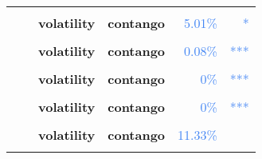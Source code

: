 \documentclass[
  authoryear,
  preprint,
  3p]{elsarticle}
\begin{document}
\begin{longtable}[t]{>{}l>{}l>{}l>{}l>{}r>{}r}
\textbf{\cellcolor{gray!10}{}} & \textbf{\cellcolor{gray!10}{financialisation}} & \textbf{\cellcolor{gray!10}{mean}} & \textbf{\cellcolor{gray!10}{contango}} & \textcolor[HTML]{4285f4}{\cellcolor{gray!10}{88.44\%}} & \textcolor[HTML]{4285f4}{\cellcolor{gray!10}{}}\\
\textbf{} & \textbf{} & \textbf{volatility} & \textbf{contango} & \textcolor[HTML]{4285f4}{5.01\%} & \textcolor[HTML]{4285f4}{*}\\
\textbf{\cellcolor{gray!10}{}} & \textbf{\cellcolor{gray!10}{crisis}} & \textbf{\cellcolor{gray!10}{mean}} & \textbf{\cellcolor{gray!10}{contango}} & \textcolor[HTML]{4285f4}{\cellcolor{gray!10}{87.12\%}} & \textcolor[HTML]{4285f4}{\cellcolor{gray!10}{}}\\
\textbf{} & \textbf{} & \textbf{volatility} & \textbf{contango} & \textcolor[HTML]{4285f4}{0.08\%} & \textcolor[HTML]{4285f4}{***}\\
\addlinespace
\textbf{\cellcolor{gray!10}{}} & \textbf{\cellcolor{gray!10}{post-crisis}} & \textbf{\cellcolor{gray!10}{mean}} & \textbf{\cellcolor{gray!10}{backwardation}} & \textcolor[HTML]{4285f4}{\cellcolor{gray!10}{61.83\%}} & \textcolor[HTML]{4285f4}{\cellcolor{gray!10}{}}\\
\textbf{} & \textbf{} & \textbf{volatility} & \textbf{contango} & \textcolor[HTML]{4285f4}{0\%} & \textcolor[HTML]{4285f4}{\vphantom{10} ***}\\
\textbf{\cellcolor{gray!10}{Aluminium-primary (XLME)}} & \textbf{\cellcolor{gray!10}{past}} & \textbf{\cellcolor{gray!10}{mean}} & \textbf{\cellcolor{gray!10}{backwardation}} & \textcolor[HTML]{4285f4}{\cellcolor{gray!10}{86.1\%}} & \textcolor[HTML]{4285f4}{\cellcolor{gray!10}{}}\\
\textbf{} & \textbf{} & \textbf{volatility} & \textbf{contango} & \textcolor[HTML]{4285f4}{0\%} & \textcolor[HTML]{4285f4}{\vphantom{9} ***}\\
\textbf{\cellcolor{gray!10}{}} & \textbf{\cellcolor{gray!10}{financialisation}} & \textbf{\cellcolor{gray!10}{mean}} & \textbf{\cellcolor{gray!10}{backwardation}} & \textcolor[HTML]{4285f4}{\cellcolor{gray!10}{91.59\%}} & \textcolor[HTML]{4285f4}{\cellcolor{gray!10}{}}\\
\addlinespace
\textbf{} & \textbf{} & \textbf{volatility} & \textbf{contango} & \textcolor[HTML]{4285f4}{11.33\%} & \textcolor[HTML]{4285f4}{}\\
\textbf{\cellcolor{gray!10}{}} & \textbf{\cellcolor{gray!10}{crisis}} & \textbf{\cellcolor{gray!10}{mean}} & \textbf{\cellcolor{gray!10}{backwardation}} & \textcolor[HTML]{4285f4}{\cellcolor{gray!10}{10.79\%}} & \textcolor[HTML]{4285f4}{\cellcolor{gray!10}{}}\\

\end{longtable}
\end{document}
